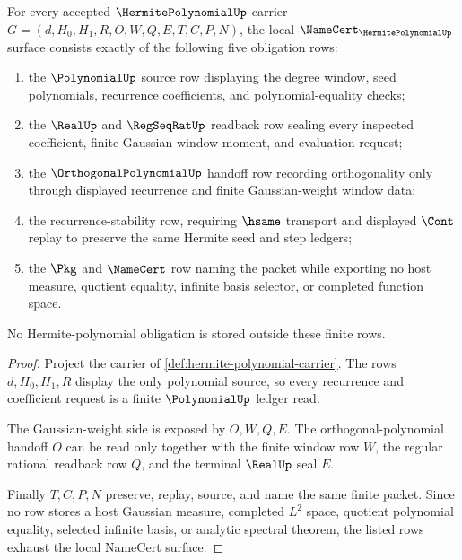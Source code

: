 \begin{theorem}
\label{thm:hermite-polynomial-namecert-obligations}
For every accepted $\HermitePolynomialUp$ carrier $G=(d,H_0,H_1,R,O,W,Q,E,T,C,P,N)$, the local $\NameCert_{\HermitePolynomialUp}$ surface consists exactly of the following five obligation rows:
\begin{enumerate}
\item the $\PolynomialUp$ source row displaying the degree window, seed polynomials, recurrence coefficients, and polynomial-equality checks;
\item the $\RealUp$ and $\RegSeqRatUp$ readback row sealing every inspected coefficient, finite Gaussian-window moment, and evaluation request;
\item the $\OrthogonalPolynomialUp$ handoff row recording orthogonality only through displayed recurrence and finite Gaussian-weight window data;
\item the recurrence-stability row, requiring $\hsame$ transport and displayed $\Cont$ replay to preserve the same Hermite seed and step ledgers;
\item the $\Pkg$ and $\NameCert$ row naming the packet while exporting no host measure, quotient equality, infinite basis selector, or completed function space.
\end{enumerate}
No Hermite-polynomial obligation is stored outside these finite rows.
\end{theorem}
\begin{proof}
Project the carrier of \autoref{def:hermite-polynomial-carrier}. The rows $d,H_0,H_1,R$ display the only polynomial source, so every recurrence and coefficient request is a finite $\PolynomialUp$ ledger read.

The Gaussian-weight side is exposed by $O,W,Q,E$. The orthogonal-polynomial handoff $O$ can be read only together with the finite window row $W$, the regular rational readback row $Q$, and the terminal $\RealUp$ seal $E$.

Finally $T,C,P,N$ preserve, replay, source, and name the same finite packet. Since no row stores a host Gaussian measure, completed $L^2$ space, quotient polynomial equality, selected infinite basis, or analytic spectral theorem, the listed rows exhaust the local NameCert surface.
\end{proof}

